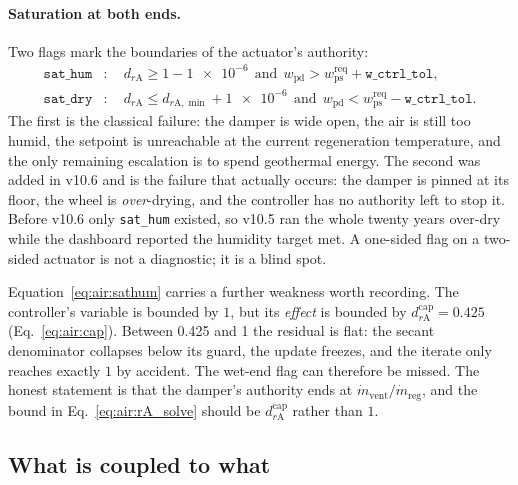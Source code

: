 \documentclass[11pt]{article}
\newcommand{\mdr}{\ensuremath{\dot m_{\mathrm{reg}}}}
\newcommand{\mdv}{\ensuremath{\dot m_{\mathrm{vent}}}}
\begin{document}
\paragraph{Saturation at both ends.} Two flags mark the boundaries of the
actuator's authority:
\begin{align}
\texttt{sat\_hum} &:\quad d_{r\mathrm{A}} \ge 1-\num{1e-6}
   \ \ \text{and}\ \ w_{\mathrm{pd}} > w_{\mathrm{ps}}^{\mathrm{req}}
   + \texttt{w\_ctrl\_tol},
\label{eq:air:sathum}\\
\texttt{sat\_dry} &:\quad d_{r\mathrm{A}} \le d_{r\mathrm{A},\min}+\num{1e-6}
   \ \ \text{and}\ \ w_{\mathrm{pd}} < w_{\mathrm{ps}}^{\mathrm{req}}
   - \texttt{w\_ctrl\_tol}.
\label{eq:air:satdry}
\end{align}
The first is the classical failure: the damper is wide open, the air is still
too humid, the setpoint is unreachable at the current regeneration temperature,
and the only remaining escalation is to spend geothermal energy. The second was
added in v10.6 and is the failure that actually occurs: the damper is pinned at
its floor, the wheel is \emph{over}-drying, and the controller has no authority
left to stop it. Before v10.6 only \texttt{sat\_hum} existed, so v10.5 ran the
whole twenty years over-dry while the dashboard reported the humidity target
met. A one-sided flag on a two-sided actuator is not a diagnostic; it is a
blind spot.

Equation~\eqref{eq:air:sathum} carries a further weakness worth recording. The
controller's variable is bounded by $1$, but its \emph{effect} is bounded by
$d_{r\mathrm{A}}^{\mathrm{cap}}=\num{0.425}$ (Eq.~\eqref{eq:air:cap}). Between
\num{0.425} and \num{1} the residual is flat: the secant denominator collapses
below its guard, the update freezes, and the iterate only reaches exactly $1$
by accident. The wet-end flag can therefore be missed. The honest statement is
that the damper's authority ends at $\mdv/\mdr$, and the bound in
Eq.~\eqref{eq:air:rA_solve} should be $d_{r\mathrm{A}}^{\mathrm{cap}}$ rather
than $1$.

\subsection{What is coupled to what}
\label{sec:air:coupling}
\end{document}
